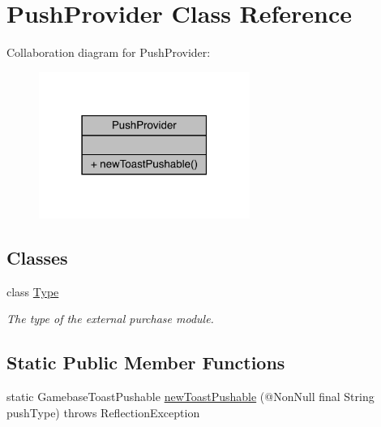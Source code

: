 \hypertarget{classcom_1_1toast_1_1android_1_1gamebase_1_1base_1_1push_1_1_push_provider}{}\section{Push\+Provider Class Reference}
\label{classcom_1_1toast_1_1android_1_1gamebase_1_1base_1_1push_1_1_push_provider}


Collaboration diagram for Push\+Provider\+:
\nopagebreak
\begin{figure}[H]
\begin{center}
\leavevmode
\includegraphics[width=195pt]{classcom_1_1toast_1_1android_1_1gamebase_1_1base_1_1push_1_1_push_provider__coll__graph}
\end{center}
\end{figure}
\subsection*{Classes}
\begin{DoxyCompactItemize}
\item 
class \hyperlink{classcom_1_1toast_1_1android_1_1gamebase_1_1base_1_1push_1_1_push_provider_1_1_type}{Type}
\begin{DoxyCompactList}\small\item\em The type of the external purchase module. \end{DoxyCompactList}\end{DoxyCompactItemize}
\subsection*{Static Public Member Functions}
\begin{DoxyCompactItemize}
\item 
static Gamebase\+Toast\+Pushable \hyperlink{classcom_1_1toast_1_1android_1_1gamebase_1_1base_1_1push_1_1_push_provider_a10a9c420b09b8c3741cc589f13b120c9}{new\+Toast\+Pushable} (@Non\+Null final String push\+Type)  throws Reflection\+Exception 
\end{DoxyCompactItemize}


